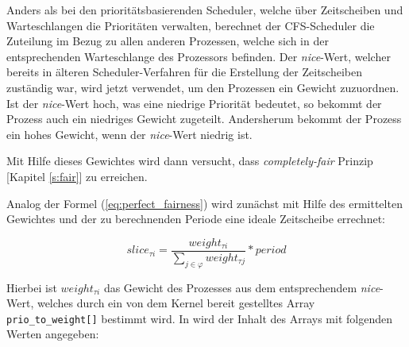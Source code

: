 Anders als bei den prioritätsbasierenden Scheduler, welche über Zeitscheiben und Warte\-schlan\-gen die Prioritäten verwalten, berechnet der CFS-Scheduler die Zuteilung im Bezug zu allen anderen Prozessen, welche sich in der entsprechenden Warteschlange des Prozessors befinden. Der  \textit{nice}-Wert, welcher bereits in älteren Scheduler-\-Ver\-fahren für die Erstellung der Zeitscheiben zuständig war, wird jetzt verwendet, um den Prozessen ein Gewicht zuzuordnen. Ist der \textit{nice}-Wert hoch, was eine niedrige Priorität bedeutet, so bekommt der Prozess auch ein niedriges Gewicht zugeteilt. Andersherum bekommt der Prozess ein hohes Gewicht, wenn der  \textit{nice}-Wert niedrig ist.

Mit Hilfe dieses Gewichtes wird dann versucht, dass \textit{com\-pletely-fair} Prinzip [Kapitel \ref{s:fair}] zu erreichen. 

Analog der Formel (\ref{eq:perfect_fairness}) wird zunächst mit Hilfe des ermittelten Gewichtes und der zu berechnenden Periode eine ideale Zeitscheibe errechnet: %

\begin{equation}
slice_{\tau i} = \frac{weight_{\tau i}}{\sum_{j\in\varphi} weight_{\tau j}} * period
\label{eq:slice}
\end{equation}


Hierbei ist \textit{$weight_{\tau i}$} das Gewicht des Prozesses aus dem entsprechendem \textit{nice}-Wert, welches durch ein von dem Kernel bereit gestelltes Array \texttt{prio\_to\_weight[]} bestimmt wird. In \cite{nikita} wird der Inhalt des Arrays mit folgenden Werten angegeben:


